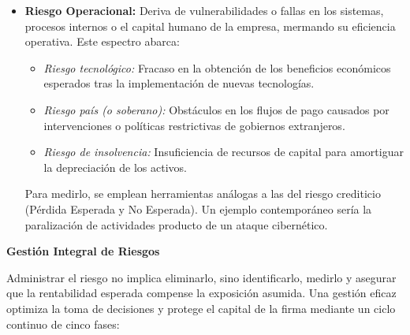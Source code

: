 \begin{itemize}[label=\textcolor{azulp}{\textbullet}, leftmargin=0.8cm]
    \item \textbf{Riesgo Operacional:} Deriva de vulnerabilidades o fallas en los sistemas, procesos internos o el capital humano de la empresa, mermando su eficiencia operativa. Este espectro abarca:
    \begin{itemize}[label=\textcolor{azulp}{$\circ$}]
        \item \textit{Riesgo tecnológico:} Fracaso en la obtención de los beneficios económicos esperados tras la implementación de nuevas tecnologías.
        \item \textit{Riesgo país (o soberano):} Obstáculos en los flujos de pago causados por intervenciones o políticas restrictivas de gobiernos extranjeros.
        \item \textit{Riesgo de insolvencia:} Insuficiencia de recursos de capital para amortiguar la depreciación de los activos.
    \end{itemize}
    Para medirlo, se emplean herramientas análogas a las del riesgo crediticio (Pérdida Esperada y No Esperada). Un ejemplo contemporáneo sería la paralización de actividades producto de un ataque cibernético.
\end{itemize}

\vspace{0.5cm}
\noindent \textcolor{azulp}{\textbf{Gestión Integral de Riesgos}}
\vspace{0.2cm}


\noindent Administrar el riesgo no implica eliminarlo, sino identificarlo, medirlo y asegurar que la rentabilidad esperada compense la exposición asumida. Una gestión eficaz optimiza la toma de decisiones y protege el capital de la firma mediante un ciclo continuo de cinco fases:

